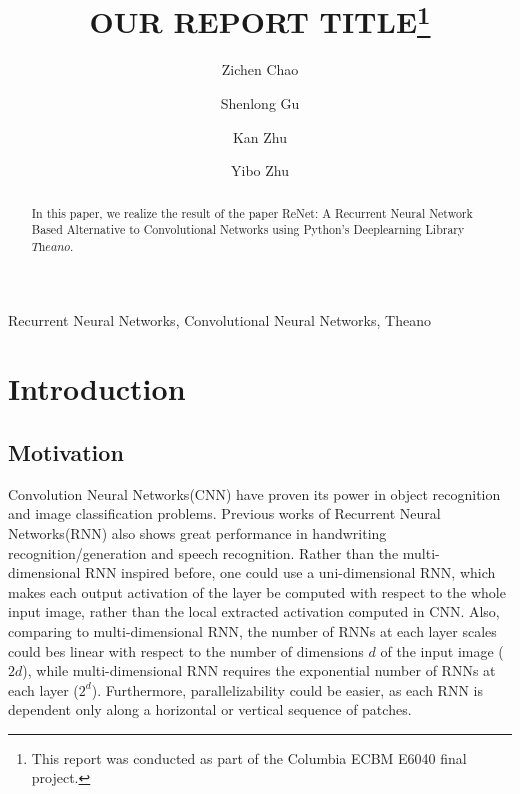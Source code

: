 \documentclass[final,leqno]{siamltex}
\title{OUR REPORT TITLE\thanks{This report was conducted as part of the Columbia ECBM E6040 final project.}}
\author{Zichen Chao\footnotemark[2] \and Shenlong Gu\footnotemark[2] \and Kan Zhu\footnotemark[2] \and Yibo Zhu\footnotemark[3]}
\begin{document}
\maketitle

\renewcommand{\thefootnote}{\fnsymbol{footnote}}


\begin{abstract} 
In this paper, we realize the result of the paper ReNet: A Recurrent Neural Network Based Alternative to Convolutional Networks \cite{renet} using Python's Deeplearning Library $\textit{Theano}$.

\end{abstract} 

\begin{keywords}
Recurrent Neural Networks, Convolutional Neural Networks, Theano
\end{keywords}

\pagestyle{myheadings}
\thispagestyle{plain}

\section{Introduction}
\subsection{Motivation}
Convolution Neural Networks(CNN) have proven its power in object recognition and image classification problems. Previous works of Recurrent Neural Networks(RNN) also shows great performance in handwriting recognition/generation and speech recognition. Rather than the multi-dimensional RNN inspired before, one could use a uni-dimensional RNN, which makes each output activation of the layer be computed with respect to the whole input image, rather than the local extracted activation computed in CNN. Also, comparing to multi-dimensional RNN, the number of RNNs at each layer scales could bes linear with respect to the number of dimensions $d$ of the input image ($2d$), while multi-dimensional RNN requires the exponential number of RNNs at each layer ($2^d$). Furthermore, parallelizability could be easier, as each RNN is dependent only along a horizontal or vertical sequence of patches. 
\end{document}
